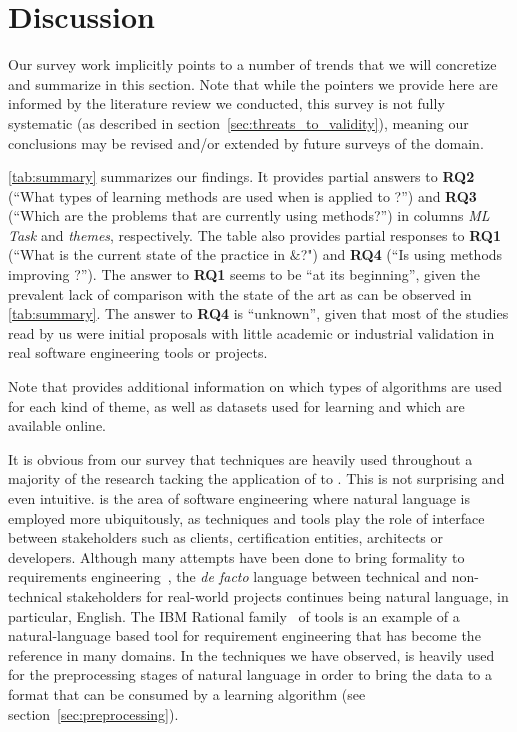 \section{Discussion}
\label{sec:discussion}

Our survey work implicitly points to a number of trends that we will
concretize and summarize in this section. Note that while the pointers we
provide here are informed by the literature review we conducted, this survey is
not fully systematic (as described in section~\ref{sec:threats_to_validity}),
meaning our conclusions may be revised and/or extended by future surveys of the
domain.

\Tab \ref{tab:summary} summarizes our findings. It provides partial answers to
\textbf{RQ2} (``What types of learning methods are used when \ML is applied to
\RE?'') and \textbf{RQ3} (``Which are the \RE problems that are currently using
\ML methods?'') in columns \emph{ML Task} and  \emph{themes}, respectively.
The table also provides partial responses to \textbf{RQ1} (``What is the current
state of the practice in \ML${\&}$\RE?") and \textbf{RQ4} (``Is using \ML
methods improving \RE?''). The answer to \textbf{RQ1} seems to be ``at its
beginning'', given the prevalent lack of comparison with the state of the art
as can be observed in \tab \ref{tab:summary}. The answer to \textbf{RQ4} is
``unknown'', given that most of the studies read by us were initial proposals
with little academic or industrial validation in real software engineering tools or projects.

Note that  provides additional information on which types of
algorithms are used for each kind of theme, as well as datasets used for
learning and which are available online.

It is obvious from our survey that \NLP techniques are heavily used
throughout a majority of the research tacking the application of \ML to
\RE. This is not surprising and even intuitive. \RE is the area of software
engineering where natural language is employed more ubiquitously, as \RE
techniques and tools play the role of interface between stakeholders such as
clients, certification entities, architects or developers. Although many
attempts have been done to bring formality to requirements
engineering~\cite{Teufl17,LucioRCA16}, the \emph{de facto} language between
technical and non-technical stakeholders for real-world projects continues being
natural language, in particular, English.
The IBM Rational \DOORS family~\cite{doors} of tools is an example
of a natural-language based tool for requirement engineering that has become the
reference in many domains. In the techniques we have observed, \NLP is heavily
used for the preprocessing stages of natural language in order to bring the data to a format
that can be consumed by a learning algorithm (see
section~\ref{sec:preprocessing}).
 
